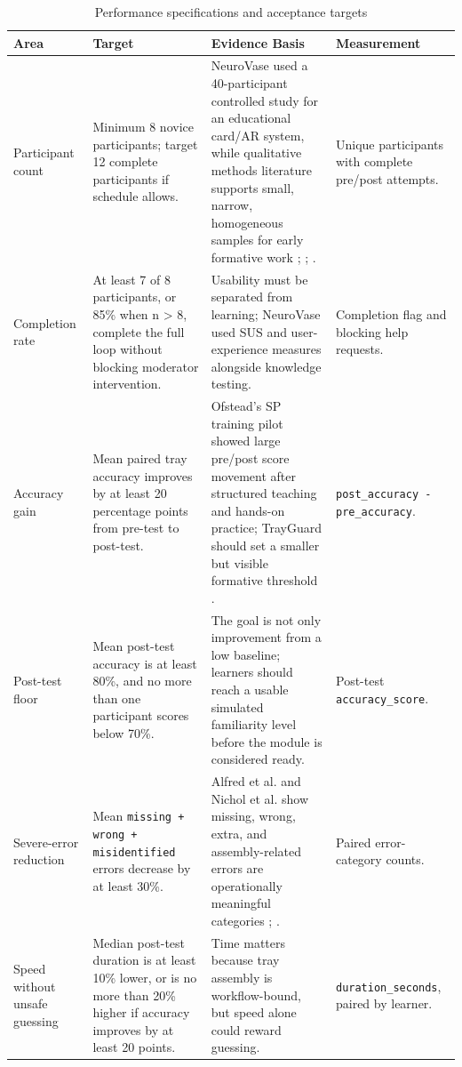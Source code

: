 \documentclass[10pt,a4paper]{article}
\begin{document}
\begin{table}[H]
\centering
\caption{Performance specifications and acceptance targets}
\label{tab:performance-specifications-and-acceptance-targets}
\small\renewcommand{\arraystretch}{1.2}\setlength{\tabcolsep}{4pt}
\begin{tabularx}{\textwidth}{|>{\raggedright\arraybackslash}X|>{\raggedright\arraybackslash}X|>{\raggedright\arraybackslash}X|>{\raggedright\arraybackslash}X|}
\hline
Area & Target & Evidence Basis & Measurement \\
\hline
Participant count & Minimum 8 novice participants; target 12 complete participants if schedule allows. & NeuroVase used a 40-participant controlled study for an educational card/AR system, while qualitative methods literature supports small, narrow, homogeneous samples for early formative work \cite{jahani-et-al-2026-neurovase}; \cite{malterud-et-al-2016}; \cite{hennink-and-kaiser-2022}. & Unique participants with complete pre/post attempts. \\
\hline
Completion rate & At least 7 of 8 participants, or 85\% when n > 8, complete the full loop without blocking moderator intervention. & Usability must be separated from learning; NeuroVase used SUS and user-experience measures alongside knowledge testing. & Completion flag and blocking help requests. \\
\hline
Accuracy gain & Mean paired tray accuracy improves by at least 20 percentage points from pre-test to post-test. & Ofstead's SP training pilot showed large pre/post score movement after structured teaching and hands-on practice; TrayGuard should set a smaller but visible formative threshold \cite{ofstead-et-al-2023}. & \texttt{post\_accuracy - pre\_accuracy}. \\
\hline
Post-test floor & Mean post-test accuracy is at least 80\%, and no more than one participant scores below 70\%. & The goal is not only improvement from a low baseline; learners should reach a usable simulated familiarity level before the module is considered ready. & Post-test \texttt{accuracy\_score}. \\
\hline
Severe-error reduction & Mean \texttt{missing + wrong + misidentified} errors decrease by at least 30\%. & Alfred et al. and Nichol et al. show missing, wrong, extra, and assembly-related errors are operationally meaningful categories \cite{alfred-et-al-2021}; \cite{nichol-et-al-2024}. & Paired error-category counts. \\
\hline
Speed without unsafe guessing & Median post-test duration is at least 10\% lower, or is no more than 20\% higher if accuracy improves by at least 20 points. & Time matters because tray assembly is workflow-bound, but speed alone could reward guessing. & \texttt{duration\_seconds}, paired by learner. \\

\end{tabularx}
\end{table}
\end{document}
